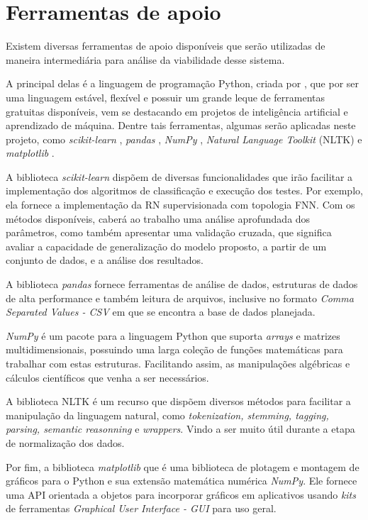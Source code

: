 \section{Ferramentas de apoio}
Existem diversas ferramentas de apoio disponíveis que serão utilizadas de maneira intermediária para análise da viabilidade desse sistema. 

A principal delas é a linguagem de programação Python, criada por \cite{python}, que por ser uma linguagem estável, flexível e possuir um grande leque de ferramentas gratuitas disponíveis, vem se destacando em projetos de inteligência artificial e aprendizado de máquina. Dentre tais ferramentas, algumas serão aplicadas neste projeto, como \textit{scikit-learn} \citep{scikitlearn}, \textit{pandas} \citep{pandas}, \textit{NumPy} \citep{van2011numpy}, \textit{Natural Language Toolkit} (NLTK) \citep{nltk} e \textit{matplotlib} \citep{matplotlib}.

A biblioteca \textit{scikit-learn} dispõem de diversas funcionalidades que irão facilitar a implementação dos algoritmos de classificação e execução dos testes. Por exemplo, ela fornece a implementação da RN supervisionada com topologia FNN. Com os métodos disponíveis, caberá ao trabalho uma análise aprofundada dos parâmetros, como também apresentar uma validação cruzada, que significa avaliar a capacidade de generalização do modelo proposto, a partir de um conjunto de dados, e a análise dos resultados.

A biblioteca \textit{pandas} fornece ferramentas de análise de dados, estruturas de dados de alta performance e também leitura de arquivos, inclusive no formato \textit{Comma Separated Values - CSV} em que se encontra a base de dados planejada.

\textit{NumPy} é um pacote para a linguagem Python que suporta \textit{arrays} e matrizes multidimensionais, possuindo uma larga coleção de funções matemáticas para trabalhar com estas estruturas. Facilitando assim, as manipulações algébricas e cálculos científicos que venha a ser necessários.

A biblioteca NLTK é um recurso que dispõem diversos métodos para facilitar a manipulação da linguagem natural, como \textit{tokenization, stemming, tagging, parsing, semantic reasonning} e \textit{wrappers}. Vindo a ser muito útil durante a etapa de normalização dos dados.

Por fim, a biblioteca \textit{matplotlib} que é uma biblioteca de plotagem e montagem de gráficos para o Python e sua extensão matemática numérica \textit{NumPy}. Ele fornece uma API orientada a objetos para incorporar gráficos em aplicativos usando \textit{kits} de ferramentas \textit{Graphical User Interface - GUI} para uso geral.

